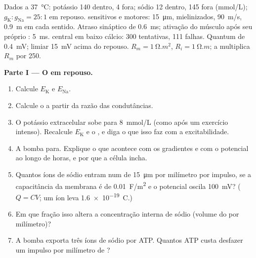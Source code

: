 \begin{problem}
\label{pb:b2:neurons-synapses:1}
Dados a \qty{37}{\celsius}: potássio 140 dentro, 4 fora; sódio 12
dentro, 145 fora (\unit{mmol/L});
$g_{\mathrm K} : g_{\mathrm{Na}} = 25 : 1$ em repouso.  sensitivos e motores: \qty{15}{\micro m},
mielinizados, \qty{90}{m/s}, \qty{0.9}{m} em cada sentido. Atraso
sináptico de \qty{0.6}{ms}; ativação do músculo após seu próprio
: \qty{5}{ms}.  central em baixo cálcio: 300
tentativas, 111 falhas. Quantum de \qty{0.4}{mV}; limiar
\qty{15}{mV} acima do repouso. $R_m =
\qty{1}{\ohm.m^2}$, $R_i = \qty{1}{\ohm.m}$; a  multiplica $R_m$
por 250.

\medskip
\noindent\textbf{Parte I --- O  em repouso.}
\begin{enumerate}
  \item Calcule $E_{\mathrm K}$ e $E_{\mathrm{Na}}$.
  \item Calcule o  a partir da razão das
        condutâncias.
  \item O potássio extracelular sobe para \qty{8}{mmol/L} (como após um
        exercício intenso). Recalcule $E_{\mathrm K}$ e o , e diga o que isso faz com a excitabilidade.
  \item A bomba para. Explique o que acontece com os gradientes e com o
        potencial ao longo de horas, e por que a célula incha.
  \item Quantos íons de sódio entram num  de \qty{15}{\micro m} por
        milímetro por impulso, se a capacitância da membrana é de
        \qty{0.01}{F/m^2} e o potencial oscila \qty{100}{mV}?
        ($Q = CV$; um íon leva \qty{1.6e-19}{C}.)
  \item Em que fração isso altera a concentração interna de sódio
        (volume do  por milímetro)?
  \item A bomba exporta três íons de sódio por ATP. Quantos ATP custa
        desfazer um impulso por milímetro de ?
\end{enumerate}


\end{problem}
